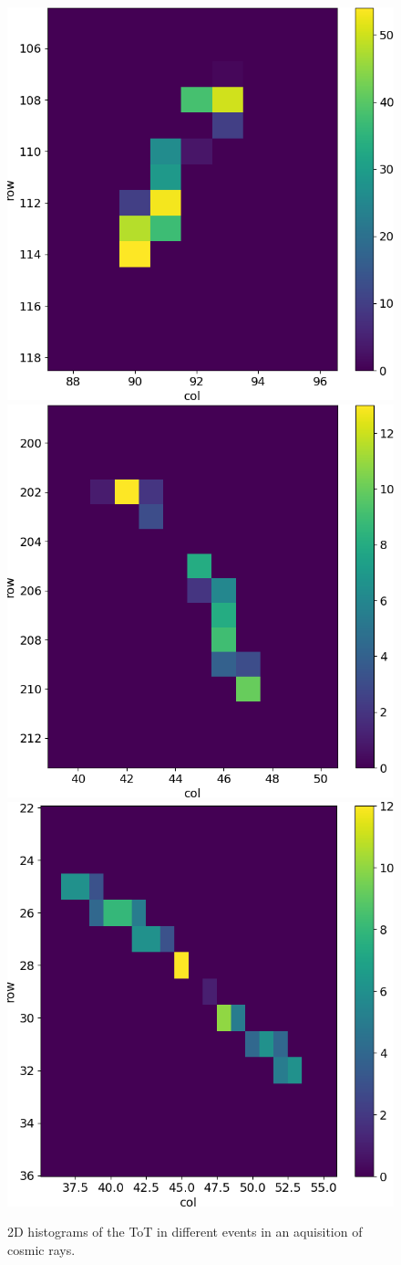 \begin{figure}[h!]
            \includegraphics[width=.24\linewidth]{figures/charaterization/evts/cosmic_rays/12.png}
            \includegraphics[width=.24\linewidth]{figures/charaterization/evts/cosmic_rays/12b.png}               
            \includegraphics[width=.24\linewidth]{figures/charaterization/evts/cosmic_rays/19a.png}
            \caption{2D histograms of the ToT in different events in an aquisition of cosmic rays.}
            \label{fig:hit_map_cosmic_rays}
        \end{figure} 

